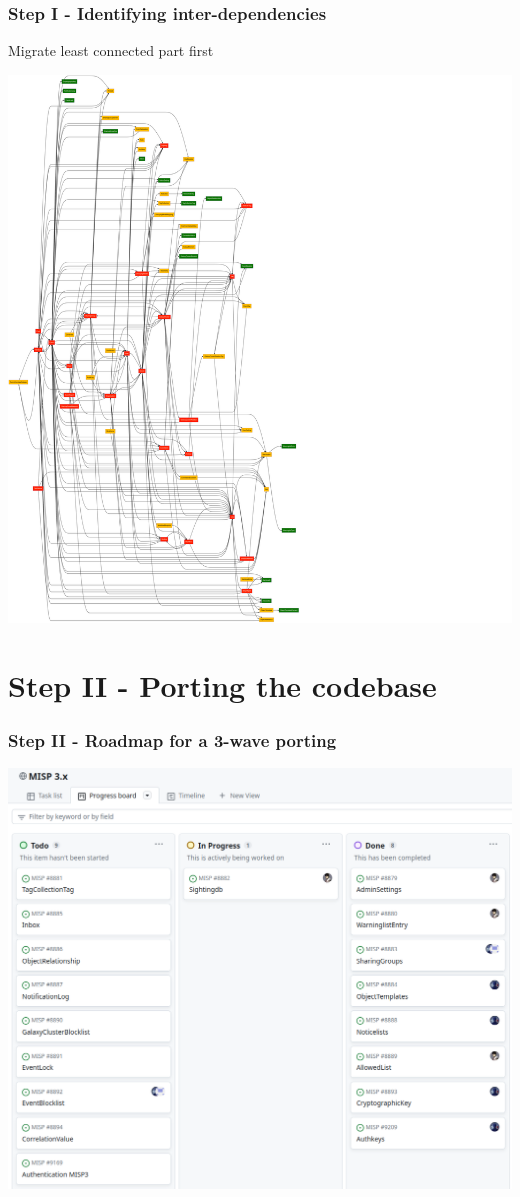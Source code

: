\begin{frame}
    \frametitle{Step I - Identifying inter-dependencies}
    Migrate least connected part first
    \begin{center}
        \includegraphics[scale=0.06,angle=-90,origin=c]{pictures/controller-dep.png} 
    \end{center}
\end{frame}


\section{Step II - Porting the codebase}
\begin{frame}
    \frametitle{Step II - Roadmap for a 3-wave porting}
    \begin{center}
        \includegraphics[width=0.99\linewidth]{pictures/misp3-github-project.png}
    \end{center}
\end{frame}

